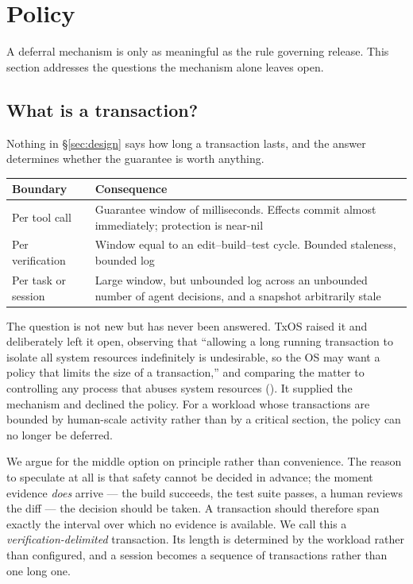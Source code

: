 \documentclass[10pt,twocolumn]{article}
\begin{document}
\section{Policy}
\label{sec:policy}

A deferral mechanism is only as meaningful as the rule governing release. This
section addresses the questions the mechanism alone leaves open.

\subsection{What is a transaction?}
\label{sec:boundary}

Nothing in \S\ref{sec:design} says how long a transaction lasts, and the answer
determines whether the guarantee is worth anything.

\begin{center}
\small
\begin{tabular}{@{}lp{4.1cm}@{}}
\toprule
\textbf{Boundary} & \textbf{Consequence}\\
\midrule
Per tool call & Guarantee window of milliseconds. Effects commit almost
                immediately; protection is near-nil\\
Per verification & Window equal to an edit--build--test cycle. Bounded
                staleness, bounded log\\
Per task or session & Large window, but unbounded log across an unbounded
                number of agent decisions, and a snapshot arbitrarily stale\\
\bottomrule
\end{tabular}
\end{center}

The question is not new but has never been answered. TxOS raised it and
deliberately left it open, observing that ``allowing a long running transaction
to isolate all system resources indefinitely is undesirable, so the OS may want
a policy that limits the size of a transaction,'' and comparing the matter to
controlling any process that abuses system resources
(\cite[\S3.1.3]{porter2009txos}). It supplied the mechanism and declined the
policy. For a workload whose transactions are bounded by human-scale activity
rather than by a critical section, the policy can no longer be deferred.

We argue for the middle option on principle rather than convenience. The reason
to speculate at all is that safety cannot be decided in advance; the moment
evidence \emph{does} arrive --- the build succeeds, the test suite passes, a
human reviews the diff --- the decision should be taken. A transaction should
therefore span exactly the interval over which no evidence is available. We call
this a \emph{verification-delimited} transaction. Its length is determined by
the workload rather than configured, and a session becomes a sequence of
transactions rather than one long one.
\end{document}
